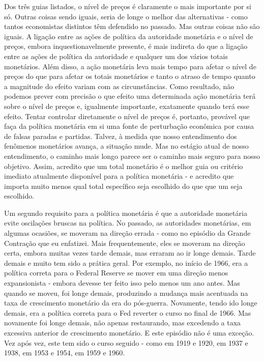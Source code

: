 \documentclass[12pt]{article}
\begin{document}
Dos três guias listados, o nível de preços é claramente o mais importante por si só. Outras coisas sendo iguais, seria de longe o melhor das alternativas - como tantos economistas distintos têm defendido no passado. Mas outras coisas não são iguais. A ligação entre as ações de política da autoridade monetária e o nível de preços, embora inquestionavelmente presente, é mais indireta do que a ligação entre as ações de política da autoridade e qualquer um dos vários totais monetários. Além disso, a ação monetária leva mais tempo para afetar o nível de preços do que para afetar os totais monetários e tanto o atraso de tempo quanto a magnitude do efeito variam com as circunstâncias. Como resultado, não podemos prever com precisão o que efeito uma determinada ação monetária terá sobre o nível de preços e, igualmente importante, exatamente quando terá esse efeito. Tentar controlar diretamente o nível de preços é, portanto, provável que faça da política monetária em si uma fonte de perturbação econômica por causa de falsas paradas e partidas. Talvez, à medida que nosso entendimento dos fenômenos monetários avança, a situação mude. Mas no estágio atual de nosso entendimento, o caminho mais longo parece ser o caminho mais seguro para nosso objetivo. Assim, acredito que um total monetário é o melhor guia ou critério imediato atualmente disponível para a política monetária - e acredito que importa muito menos qual total específico seja escolhido do que que um seja escolhido.

Um segundo requisito para a política monetária é que a autoridade monetária evite oscilações bruscas na política. No passado, as autoridades monetárias, em algumas ocasiões, se moveram na direção errada - como no episódio da Grande Contração que eu enfatizei. Mais frequentemente, eles se moveram na direção certa, embora muitas vezes tarde demais, mas erraram ao ir longe demais. Tarde demais e muito tem sido a prática geral. Por exemplo, no início de 1966, era a política correta para o Federal Reserve se mover em uma direção menos expansionista - embora devesse ter feito isso pelo menos um ano antes. Mas quando se moveu, foi longe demais, produzindo a mudança mais acentuada na taxa de crescimento monetário da era do pós-guerra. Novamente, tendo ido longe demais, era a política correta para o Fed reverter o curso no final de 1966. Mas novamente foi longe demais, não apenas restaurando, mas excedendo a taxa excessiva anterior de crescimento monetário. E este episódio não é uma exceção. Vez após vez, este tem sido o curso seguido - como em 1919 e 1920, em 1937 e 1938, em 1953 e 1954, em 1959 e 1960.
\end{document}
